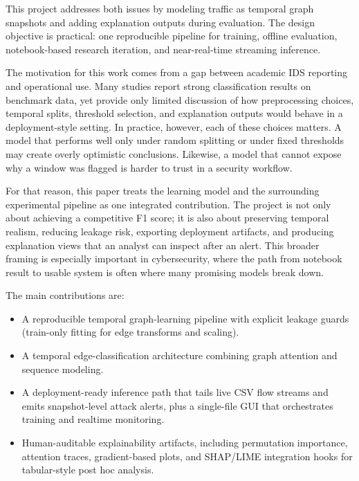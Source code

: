 \documentclass[conference]{IEEEtran}
\begin{document}
This project addresses both issues by modeling traffic as temporal graph snapshots and adding explanation outputs during evaluation. The design objective is practical: one reproducible pipeline for training, offline evaluation, notebook-based research iteration, and near-real-time streaming inference.

The motivation for this work comes from a gap between academic IDS reporting and operational use. Many studies report strong classification results on benchmark data, yet provide only limited discussion of how preprocessing choices, temporal splits, threshold selection, and explanation outputs would behave in a deployment-style setting. In practice, however, each of these choices matters. A model that performs well only under random splitting or under fixed thresholds may create overly optimistic conclusions. Likewise, a model that cannot expose why a window was flagged is harder to trust in a security workflow.

For that reason, this paper treats the learning model and the surrounding experimental pipeline as one integrated contribution. The project is not only about achieving a competitive F1 score; it is also about preserving temporal realism, reducing leakage risk, exporting deployment artifacts, and producing explanation views that an analyst can inspect after an alert. This broader framing is especially important in cybersecurity, where the path from notebook result to usable system is often where many promising models break down.

The main contributions are:
\begin{itemize}
\item A reproducible temporal graph-learning pipeline with explicit leakage guards (train-only fitting for edge transforms and scaling).
\item A temporal edge-classification architecture combining graph attention and sequence modeling.
\item A deployment-ready inference path that tails live CSV flow streams and emits snapshot-level attack alerts, plus a single-file GUI that orchestrates training and realtime monitoring.
\item Human-auditable explainability artifacts, including permutation importance, attention traces, gradient-based plots, and SHAP/LIME integration hooks for tabular-style post hoc analysis.
\end{itemize}
\end{document}
